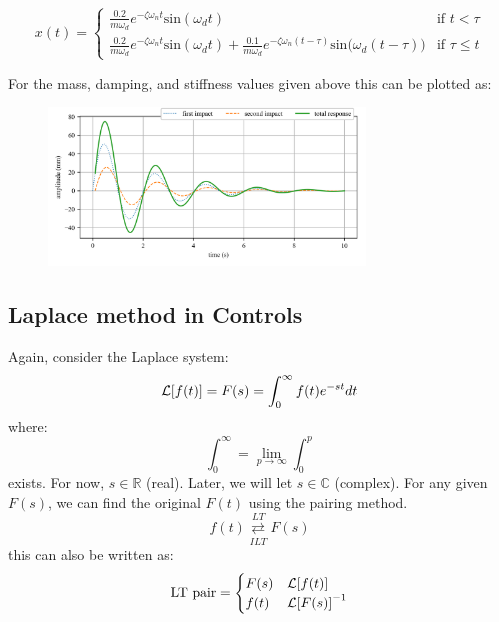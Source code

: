 \documentclass[12pt,letter]{article}
\begin{document}
\begin{example}
\[
  x(t) = 
  \begin{cases}
\frac{0.2}{m \omega_d} e^{-\zeta \omega_n t} \text{sin}(\omega_dt) & \text{if } t < \tau \\
\frac{0.2}{m \omega_d} e^{-\zeta \omega_n t} \text{sin}(\omega_dt)  + \frac{0.1}{m \omega_d} e^{-\zeta \omega_n (t-\tau)} \text{sin}\big(\omega_d(t-\tau)\big) & \text{if } \tau \leq t 
  \end{cases}
\]


For the mass, damping, and stiffness values given above this can be plotted as:
\begin{figure}[H]
	\centering
	\includegraphics[width=0.75\textwidth]{../figures/response_double_impact.png}
\end{figure}

\end{example}




		\subsection{Laplace method in Controls}

		Again, consider the Laplace system:
		\begin{equation}
				\mathcal{L}{\left[f(t)\right]} = F(s) = \int_{0}^{\infty} f(t)e^{-st}dt
		\end{equation}
		where:
		\begin{equation}
			\int_{0}^{\infty} = \lim_{p \rightarrow \infty} \int_{0}^{p}
		\end{equation}
		exists. For now, $s \in \mathbb{R}$ (real). Later, we will let $s \in \mathbb{C} $ (complex). For any given $F(s)$, we can find the original $F(t)$ using the pairing method. 
		\begin{equation}
			f(t) \overset{LT}{\underset{ILT}\rightleftarrows} F(s) 
		\end{equation}
		this can also be written as:
		\begin{equation}
		\text{LT pair} =
			\begin{cases}
			F(s) & \mathcal{L}{\left[f(t)\right]} \\
			f(t) & \mathcal{L}{\left[F(s)\right]}^{-1} \\
			\end{cases}
		\end{equation}
\end{document}
